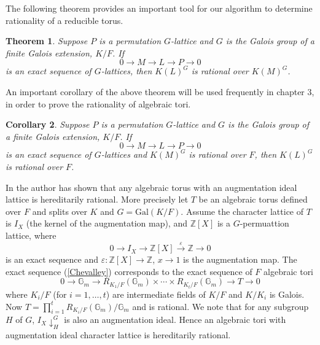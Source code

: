 \documentclass[12pt]{article}
\theoremstyle{plain}
\newtheorem{theorem}{Theorem}
\newtheorem{corollary}[theorem]{Corollary}
\theoremstyle{definition}
\newcommand{\Z}{\ensuremath{\mathbb{Z}}}
\begin{document}
The following theorem provides an important tool for our algorithm to determine rationality of a
reducible torus. 
 
\begin{theorem}\cite[Proposition 1.6]{Lenstra}\label{thm:lenstra}
Suppose $P$ is a permutation $G$-lattice and $G$ is the Galois group of a finite 
Galois extension, $K/F$.  If 
$$0 \longrightarrow M \longrightarrow L \longrightarrow P \longrightarrow 0 $$ is 
an exact sequence of $G$-lattices, then $K(L)^G$ is rational over $K(M)^G$.
\end{theorem}

An important corollary of the above theorem will be used frequently in chapter 3, 
in order to prove the rationality of algebraic tori.
\begin{corollary}\label{permcoker}
Suppose $P$ is a permutation $G$-lattice and $G$ is the Galois group of a finite 
Galois extension, $K/F$.  If $$0 \longrightarrow M \longrightarrow L \longrightarrow P \longrightarrow 0 $$ 
is an exact sequence of $G$-lattices and $K(M)^G$ is rational over $F$, then $K(L)^G$ is rational over $F$.
\end{corollary}

In \cite[Section 2.4.8]{Voskresenskii} the author has shown that any algebraic 
torus with an augmentation ideal lattice is hereditarily rational. More precisely 
let $T$ be an algebraic torus defined over $F$ and splits over $K$ and $G = \mathrm{Gal}(K/F)$. 
Assume the character lattice of $T$ is $I_X$ (the kernel of the augmentation map), 
and $\Z [X]$ is a $G$-permuattion lattice, where 
\begin{equation}\label{Chevalley}
0 \longrightarrow I_X \longrightarrow \Z [X] \overset{\varepsilon} \longrightarrow  \Z \longrightarrow 0
\end{equation}
is an exact sequence and $\varepsilon : \Z [X]  \rightarrow \Z $, $x \rightarrow 1$ 
is the augmentation map. The exact sequence (\ref{Chevalley}) corresponds to the exact 
sequence of $F$ algebraic tori
$$0 \longrightarrow \mathbb{G}_m \longrightarrow R_{K_1/F}(\mathbb{G}_m) \times \cdots \times R_{K_t/F}(\mathbb{G}_m) \longrightarrow  T \longrightarrow 0$$
where $K_i/F$ (for $i = 1, \ldots ,t $) are intermediate fields of $K/F$ and $K/K_i$ is 
Galois. Now $T = \prod^t_{i = 1}R_{K_i/F}(\mathbb{G}_m)/\mathbb{G}_m$ and is rational. 
We note that for any subgroup $H$ of $G$, ${I_X}\downarrow^G_H$ is also an augmentation 
ideal. Hence an algebraic tori with augmentation ideal character lattice is hereditarily 
rational.
\end{document}
